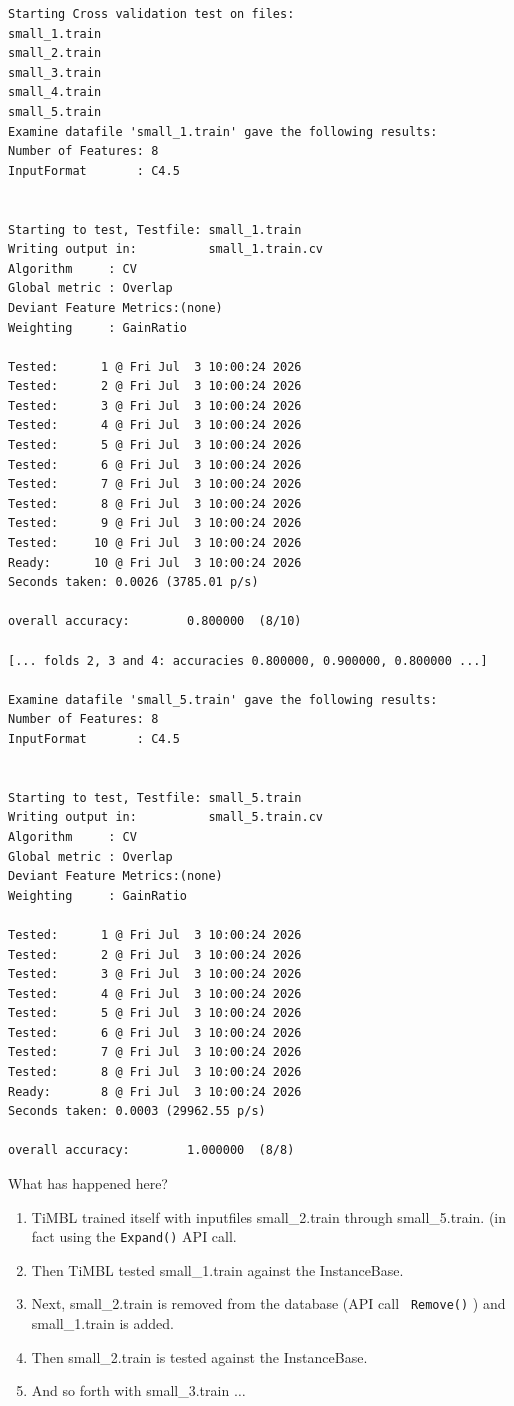 \documentclass{report}
\begin{document}
\begin{footnotesize}
\begin{verbatim}
Starting Cross validation test on files:
small_1.train
small_2.train
small_3.train
small_4.train
small_5.train
Examine datafile 'small_1.train' gave the following results:
Number of Features: 8
InputFormat       : C4.5


Starting to test, Testfile: small_1.train
Writing output in:          small_1.train.cv
Algorithm     : CV
Global metric : Overlap
Deviant Feature Metrics:(none)
Weighting     : GainRatio

Tested:      1 @ Fri Jul  3 10:00:24 2026
Tested:      2 @ Fri Jul  3 10:00:24 2026
Tested:      3 @ Fri Jul  3 10:00:24 2026
Tested:      4 @ Fri Jul  3 10:00:24 2026
Tested:      5 @ Fri Jul  3 10:00:24 2026
Tested:      6 @ Fri Jul  3 10:00:24 2026
Tested:      7 @ Fri Jul  3 10:00:24 2026
Tested:      8 @ Fri Jul  3 10:00:24 2026
Tested:      9 @ Fri Jul  3 10:00:24 2026
Tested:     10 @ Fri Jul  3 10:00:24 2026
Ready:      10 @ Fri Jul  3 10:00:24 2026
Seconds taken: 0.0026 (3785.01 p/s)

overall accuracy:        0.800000  (8/10)

[... folds 2, 3 and 4: accuracies 0.800000, 0.900000, 0.800000 ...]

Examine datafile 'small_5.train' gave the following results:
Number of Features: 8
InputFormat       : C4.5


Starting to test, Testfile: small_5.train
Writing output in:          small_5.train.cv
Algorithm     : CV
Global metric : Overlap
Deviant Feature Metrics:(none)
Weighting     : GainRatio

Tested:      1 @ Fri Jul  3 10:00:24 2026
Tested:      2 @ Fri Jul  3 10:00:24 2026
Tested:      3 @ Fri Jul  3 10:00:24 2026
Tested:      4 @ Fri Jul  3 10:00:24 2026
Tested:      5 @ Fri Jul  3 10:00:24 2026
Tested:      6 @ Fri Jul  3 10:00:24 2026
Tested:      7 @ Fri Jul  3 10:00:24 2026
Tested:      8 @ Fri Jul  3 10:00:24 2026
Ready:       8 @ Fri Jul  3 10:00:24 2026
Seconds taken: 0.0003 (29962.55 p/s)

overall accuracy:        1.000000  (8/8)
\end{verbatim}
\end{footnotesize}


What has happened here?

\begin{enumerate}
\item TiMBL trained itself with inputfiles small\_2.train through
small\_5.train. (in fact using the {\tt Expand()} API call.
\item Then TiMBL tested small\_1.train against the InstanceBase.
\item Next, small\_2.train is removed from the database (API call {\tt
Remove()} ) and small\_1.train is added.
\item Then small\_2.train is tested against the InstanceBase.
\item And so forth with small\_3.train $\ldots$
\end{enumerate}
\clearpage
\end{document}
